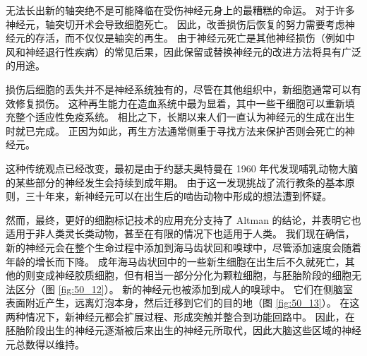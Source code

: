 无法长出新的轴突绝不是可能降临在受伤神经元身上的最糟糕的命运。 对于许多神经元，轴突切开术会导致细胞死亡。 因此，改善损伤后恢复的努力需要考虑神经元的存活，而不仅仅是轴突的再生。 由于神经元死亡是其他神经损伤（例如中风和神经退行性疾病）的常见后果，因此保留或替换神经元的改进方法将具有广泛的用途。

损伤后细胞的丢失并不是神经系统独有的，尽管在其他组织中，新细胞通常可以有效修复损伤。 这种再生能力在造血系统中最为显着，其中一些干细胞可以重新填充整个适应性免疫系统。 相比之下，长期以来人们一直认为神经元的生成在出生时就已完成。 正因为如此，再生方法通常侧重于寻找方法来保护否则会死亡的神经元。

这种传统观点已经改变，最初是由于约瑟夫奥特曼在 1960 年代发现哺乳动物大脑的某些部分的神经发生会持续到成年期。 由于这一发现挑战了流行教条的基本原则，三十年来，新神经元可以在出生后的啮齿动物中形成的想法遭到怀疑。

然而，最终，更好的细胞标记技术的应用充分支持了 Altman 的结论，并表明它也适用于非人类灵长类动物，甚至在有限的情况下也适用于人类。 我们现在确信，新的神经元会在整个生命过程中添加到海马齿状回和嗅球中，尽管添加速度会随着年龄的增长而下降。 成年海马齿状回中的一些新生细胞在出生后不久就死亡，其他的则变成神经胶质细胞，但有相当一部分分化为颗粒细胞，与胚胎阶段的细胞无法区分（图 \ref{fig:50_12}）。 
新的神经元也被添加到成人的嗅球中。 它们在侧脑室表面附近产生，远离灯泡本身，然后迁移到它们的目的地（图 \ref{fig:50_13}）。 
在这两种情况下，新神经元都会扩展过程、形成突触并整合到功能回路中。 因此，在胚胎阶段出生的神经元逐渐被后来出生的神经元所取代，因此大脑这些区域的神经元总数得以维持。



